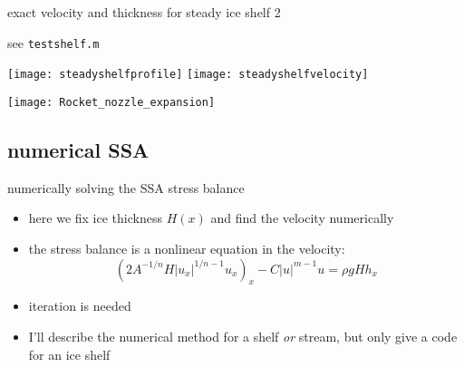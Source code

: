 \begin{frame}{exact velocity and thickness for steady ice shelf 2}

\small see \texttt{testshelf.m} 

\begin{center}
  \texttt{[image: steadyshelfprofile]} \quad
  \texttt{[image: steadyshelfvelocity]}
\end{center}

\hfill \texttt{[image: Rocket\_nozzle\_expansion]}
\end{frame}


\subsection{numerical SSA}

\begin{frame}{numerically solving the SSA stress balance}

\begin{itemize}
\item here we fix ice thickness $H(x)$ and find the velocity numerically
\item the stress balance is a nonlinear equation in the velocity:
  $$\left(2 A^{-1/n} H |u_x|^{1/n - 1} u_x\right)_x - C|u|^{m-1}u = \rho g H h_x$$
\item \alert{iteration is needed}
\item I'll describe the numerical method for a shelf \emph{or} stream, but only give a code for an ice shelf
\end{itemize}
\end{frame}


